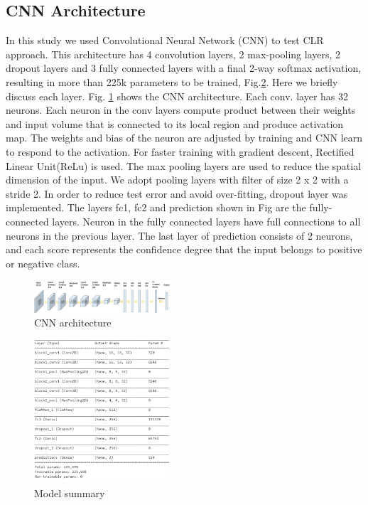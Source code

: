 \documentclass[journal, a4paper]{IEEEtran}
\begin{document}
\subsection{CNN Architecture}
In this study we used Convolutional Neural Network (CNN) to test CLR approach. This architecture has 4 convolution layers, 2 max-pooling layers, 2 dropout layers and 3 fully connected layers with a final 2-way softmax activation, resulting in more than 225k parameters to be trained, Fig.\ref{fig:model_sum}.
Here we briefly discuss each layer. Fig. \ref{fig:architecture_cnn} shows the CNN architecture.
Each conv. layer has 32 neurons. Each neuron in the conv layers compute product between their weights and input volume that is connected to its local region and produce activation map. The weights and bias of the neuron are adjusted by training and CNN learn to respond to the activation. For faster training with gradient descent, Rectified Linear Unit(ReLu) is used.
The max pooling layers are used to reduce the spatial dimension of the input. We adopt pooling layers with filter of size 2 x 2 with a stride 2. In order to reduce test error and avoid over-fitting, dropout layer was implemented.
The layers fc1, fc2 and prediction shown in Fig are the fully-connected layers. Neuron in the fully connected layers have full connections to all neurons in the previous layer. The last layer of prediction consists of 2 neurons, and each score represents the confidence degree that the input belongs to positive or negative class.
	\begin{figure}[h!]
    \centering
    \includegraphics[width=0.45\textwidth]{images/architecture_cnn2.jpg} 
    \caption{CNN architecture}
    \label{fig:architecture_cnn}
    \end{figure}

    \begin{figure}[h!]
    \centering
    \includegraphics[width=0.45\textwidth]{images/parameters_achitec.png}
    \caption{Model summary}
    \label{fig:model_sum}
    \end{figure}
\end{document}
